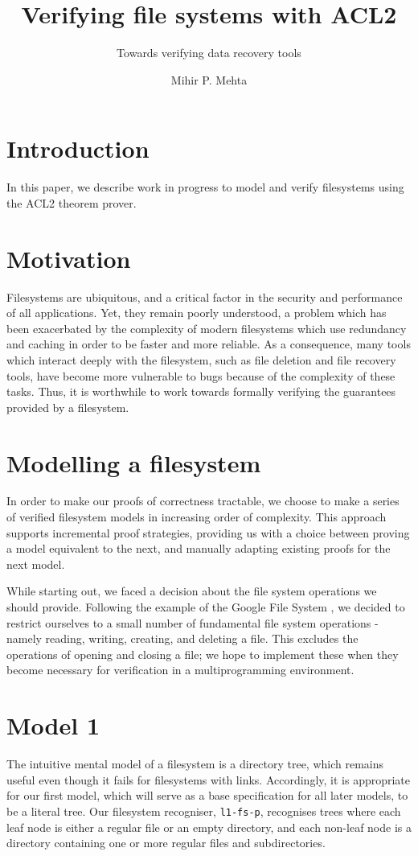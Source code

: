 \documentclass[format=sigconf,review=true]{acmart}
\title{Verifying file systems with ACL2}
\subtitle{Towards verifying data recovery tools}
\author{Mihir P. Mehta}
\affiliation{%
  \institution{University of Texas at Austin}
  \city{Austin}
  \state{TX}
  \country{USA}}
\begin{document}
\lstset{language=Lisp}

\maketitle

\section{Introduction}

In this paper, we describe work in progress to model and verify
filesystems using the ACL2 theorem prover.

\section{Motivation}
Filesystems are ubiquitous, and a critical factor in the security and
performance of all applications. Yet, they remain poorly understood,
a problem which has been exacerbated by the complexity of modern
filesystems which use redundancy and caching in order to be faster and
more reliable. As a consequence, many tools which interact deeply with
the filesystem, such as file deletion and file recovery tools, have
become more vulnerable to bugs because of the complexity of these
tasks. Thus, it is worthwhile to work towards formally verifying the
guarantees provided by a filesystem.

\section{Modelling a filesystem}

In order to make our proofs of correctness tractable, we choose to
make a series of verified filesystem models in increasing order of
complexity. This approach supports incremental proof strategies,
providing us with a choice between proving a model equivalent to the
next, and manually adapting existing proofs for the next model.

While starting out, we faced a decision about the file system
operations we should provide. Following the  example of the Google
File System \cite{ghemawat2003google}, we decided to
restrict ourselves to a small number of fundamental file system
operations - namely reading, writing, creating, and deleting a
file. This excludes the operations of opening and closing a file; we
hope to implement these when they become necessary for verification in
a multiprogramming environment.

\section{Model 1}
The intuitive mental model of a filesystem is a directory tree, which
remains useful even though it fails for filesystems with
links. Accordingly, it is appropriate for our first model, which will
serve as a base specification for all later models, to be a literal
tree. Our filesystem recogniser, \texttt{l1-fs-p}, recognises trees
where each leaf node is either a regular file or an empty directory,
and each non-leaf node is a directory containing one or more regular
files and subdirectories.
\end{document}
